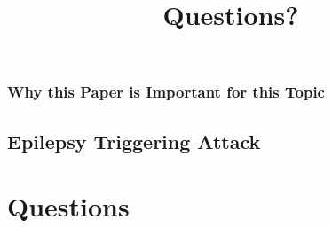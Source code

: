 \documentclass[11pt,t,usepdftitle=false,aspectratio=169]{beamer}
\begin{document}
\subsubsection{Why this Paper is Important for this Topic}%
\label{sub:why_this_paper_is_important_for_this_topic}

\subsection{Epilepsy Triggering Attack}%
\label{sub:epilepsy_triggering_attack}


\title{Questions?}
\subtitle{}
\section{Questions}


\appendix
\end{document}

